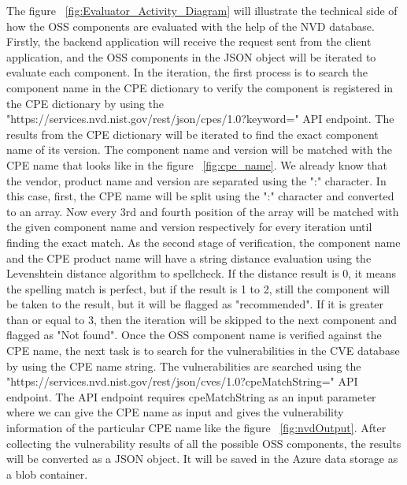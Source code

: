 The figure ~\ref{fig:Evaluator_Activity_Diagram} will illustrate the technical side of how the \acs{OSS} components are evaluated with the help of the NVD database. Firstly, the backend application will receive the request sent from the client application, and the OSS components in the JSON object will be iterated to evaluate each component. In the iteration, the first process is to search the component name in the CPE dictionary to verify the component is registered in the CPE dictionary by using the "https://services.nvd.nist.gov/rest/json/cpes/1.0?keyword=" API endpoint. The results from the CPE dictionary will be iterated to find the exact component name of its version. The component name and version will be matched with the CPE name that looks like in the figure ~\ref{fig:cpe_name}. We already know that the vendor, product name and version are separated using the ":" character. In this case, first, the CPE name will be split using the ":" character and converted to an array. Now every 3rd and fourth position of the array will be matched with the given component name and version respectively for every iteration until finding the exact match. As the second stage of verification, the component name and the CPE product name will have a string distance evaluation using the Levenshtein distance algorithm to spellcheck. If the distance result is 0, it means the spelling match is perfect, but if the result is 1 to 2, still the component will be taken to the result, but it will be flagged as "recommended". If it is greater than or equal to 3, then the iteration will be skipped to the next component and flagged as "Not found". Once the OSS component name is verified against the CPE name, the next task is to search for the vulnerabilities in the CVE database by using the CPE name string. The vulnerabilities are searched using the "https://services.nvd.nist.gov/rest/json/cves/1.0?cpeMatchString=" API endpoint. The API endpoint requires cpeMatchString as an input parameter where we can give the CPE name as input and gives the vulnerability information of the particular CPE name like the figure ~\ref{fig:nvdOutput}. After collecting the vulnerability results of all the possible OSS components, the results will be converted as a JSON object. It will be saved in the Azure data storage as a blob container. 
\newpage 
